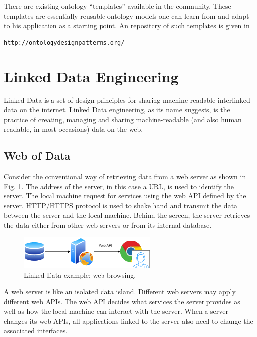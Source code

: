 There are existing ontology ``templates'' available in the community. These templates are essentially reusable ontology models one can learn from and adapt to his application as a starting point. An repository of such templates is given in 
\begin{lstlisting}
http://ontologydesignpatterns.org/
\end{lstlisting}

\section{Linked Data Engineering}

Linked Data is a set of design principles for sharing machine-readable interlinked data on the internet. Linked Data engineering, as its name suggests, is the practice of creating, managing and sharing machine-readable (and also human readable, in most occasions) data on the web.

\subsection{Web of Data}

Consider the conventional way of retrieving data from a web server as shown in Fig. \ref{fig:webbrowsing}. The address of the server, in this case a URL, is used to identify the server. The local machine request for services using the web API defined by the server. HTTP/HTTPS protocol is used to shake hand and transmit the data between the server and the local machine. Behind the screen, the server retrieves the data either from other web servers or from its internal database.
\begin{figure}[htbp]
	\centering
	\includegraphics[width=0.6\textwidth]{chapters/part-4/figures/webbrowsing.png}
	\caption{Linked Data example: web browsing.}
	\label{fig:webbrowsing}
\end{figure}

A web server is like an isolated data island. Different web servers may apply different web APIs. The web API decides what services the server provides as well as how the local machine can interact with the server. When a server changes its web APIs, all applications linked to the server also need to change the associated interfaces. 

